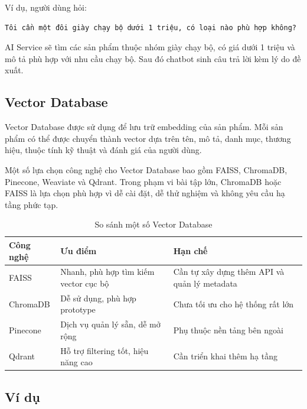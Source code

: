 \documentclass[../main.tex]{subfiles}
\begin{document}
Ví dụ, người dùng hỏi:

\begin{verbatim}
Tôi cần một đôi giày chạy bộ dưới 1 triệu, có loại nào phù hợp không?
\end{verbatim}

AI Service sẽ tìm các sản phẩm thuộc nhóm giày chạy bộ, có giá dưới 1 triệu và mô tả phù hợp với nhu cầu chạy bộ. Sau đó chatbot sinh câu trả lời kèm lý do đề xuất.

\subsection{Vector Database}

Vector Database được sử dụng để lưu trữ embedding của sản phẩm. Mỗi sản phẩm có thể được chuyển thành vector dựa trên tên, mô tả, danh mục, thương hiệu, thuộc tính kỹ thuật và đánh giá của người dùng.

Một số lựa chọn công nghệ cho Vector Database bao gồm FAISS, ChromaDB, Pinecone, Weaviate và Qdrant. Trong phạm vi bài tập lớn, ChromaDB hoặc FAISS là lựa chọn phù hợp vì dễ cài đặt, dễ thử nghiệm và không yêu cầu hạ tầng phức tạp.

\begin{table}[H]
    \centering
    \caption{So sánh một số Vector Database}
    \label{tab:chapter3-vector-database-comparison}
    \begin{tabular}{|p{}|p{}|p{}|}
        \hline
        \rowcolor{primary!35}
        \textbf{Công nghệ} & \textbf{Ưu điểm} & \textbf{Hạn chế} \\
\hline
FAISS & Nhanh, phù hợp tìm kiếm vector cục bộ & Cần tự xây dựng thêm API và quản lý metadata \\
\hline
ChromaDB & Dễ sử dụng, phù hợp prototype & Chưa tối ưu cho hệ thống rất lớn \\
\hline
Pinecone & Dịch vụ quản lý sẵn, dễ mở rộng & Phụ thuộc nền tảng bên ngoài \\
\hline
Qdrant & Hỗ trợ filtering tốt, hiệu năng cao & Cần triển khai thêm hạ tầng \\
\hline
\end{tabular}
\end{table}

\subsection{Ví dụ}
\end{document}
